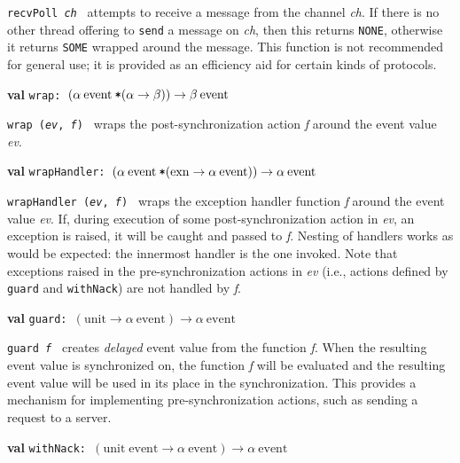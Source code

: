 \begin{descr}
\begin{speccomment}
\item {\tt recv\-Poll \textit{ch}           } 
attempts to receive a message from the channel \textit{ch}.\- 	  If there is no other thread offering to \texttt{send} a message 	  on \textit{ch}, then this returns 	  \texttt{NONE}, otherwise it 	  returns \texttt{SOME} wrapped 	  around the message.\- 	  This function is not recommended for general use; it is provided 	  as an efficiency aid for certain kinds of protocols.\-     \end{speccomment}
\item {}{\textbf{val}} {\tt wrap: \((\alpha\:\mathrm{event}\:\verb,*,(\alpha\rightarrow \beta))\rightarrow \beta\:\mathrm{event}\)}\label{val-CML.wrap}


\begin{speccomment}
\item {\tt wrap (\textit{ev}, \textit{f})           } 
wraps the post-synchronization action \textit{f} around the event 	  value \textit{ev}.\-     \end{speccomment}
\item {}{\textbf{val}} {\tt wrapHandler: \((\alpha\:\mathrm{event}\:\verb,*,(\mathrm{exn}\rightarrow \alpha\:\mathrm{event}))\rightarrow \alpha\:\mathrm{event}\)}\label{val-CML.wrapHandler}


\begin{speccomment}
\item {\tt wrap\-Handler (\textit{ev}, \textit{f})           } 
wraps the exception handler function \textit{f} around the event 	  value \textit{ev}.\- 	  If, during execution of some post-synchronization action in 	  \textit{ev}, an exception is raised, it will be caught and passed 	  to \textit{f}.\- 	  Nesting of handlers works as would be expected: the innermost 	  handler is the one invoked.\- 	  Note that exceptions raised in the pre-synchronization actions in 	  \textit{ev} (i.\-e.\-, actions defined by \texttt{guard} and \texttt{with\-Nack}) 	  are not handled by \textit{f}.\-     \end{speccomment}
\item {}{\textbf{val}} {\tt guard: \((\mathrm{unit}\rightarrow \alpha\:\mathrm{event})\rightarrow \alpha\:\mathrm{event}\)}\label{val-CML.guard}


\begin{speccomment}
\item {\tt guard \textit{f}           } 
creates \textit{delayed} event value from the function \textit{f}.\- 	  When the resulting event value is synchronized on, the function 	  \textit{f} will be evaluated and the resulting event value will be 	  used in its place in the synchronization.\- 	  This provides a mechanism for implementing pre-synchronization 	  actions, such as sending a request to a server.\-     \end{speccomment}
\item {}{\textbf{val}} {\tt withNack: \((\mathrm{unit}\;\mathrm{event}\rightarrow \alpha\:\mathrm{event})\rightarrow \alpha\:\mathrm{event}\)}\label{val-CML.withNack}



\end{descr}
